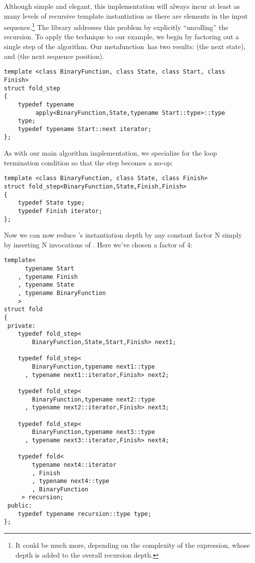 \documentclass{kapproc}
\newcommand{\mfn}{meta\-func\-tion}
\begin{document}
Although simple and elegant, this implementation will always incur at
least as many levels of recursive template instantiation as there are
elements in the input sequence.\footnote{It could be much more,
depending on the complexity of the  expression, whose
depth is added to the overall recursion depth.} The library addresses
this problem by explicitly ``unrolling'' the recursion. To apply the
technique to our  example, we begin by factoring out a
single step of the algorithm. Our  \mfn\ has two
results:  (the next state), and  (the next sequence position).

{\small
\begin{codesamp}\begin{verbatim}
template <class BinaryFunction, class State, class Start, class Finish>
struct fold_step
{
    typedef typename
         apply<BinaryFunction,State,typename Start::type>::type
    type;
    typedef typename Start::next iterator;
};
\end{verbatim}
\end{codesamp}
}

As with our main algorithm implementation, we specialize for the loop
termination condition so that the step becomes a no-op:

{\small
\begin{codesamp}\begin{verbatim}
template <class BinaryFunction, class State, class Finish>
struct fold_step<BinaryFunction,State,Finish,Finish>
{
    typedef State type;
    typedef Finish iterator;
};
\end{verbatim}
\end{codesamp}
}

Now we can now reduce 's instantiation depth by any
constant factor N simply by inserting N invocations of
. Here we've chosen a factor of 4:

{\small
\begin{codesamp}\begin{verbatim}
template<
      typename Start
    , typename Finish
    , typename State
    , typename BinaryFunction
    >
struct fold
{
 private:
    typedef fold_step<
        BinaryFunction,State,Start,Finish> next1;
    
    typedef fold_step<
        BinaryFunction,typename next1::type
      , typename next1::iterator,Finish> next2;
    
    typedef fold_step<
        BinaryFunction,typename next2::type
      , typename next2::iterator,Finish> next3;
    
    typedef fold_step<
        BinaryFunction,typename next3::type
      , typename next3::iterator,Finish> next4;
    
    typedef fold<
        typename next4::iterator
        , Finish
        , typename next4::type
        , BinaryFunction
     > recursion;
 public:
    typedef typename recursion::type type;
};
\end{verbatim}
\end{codesamp}
}
\end{document}
